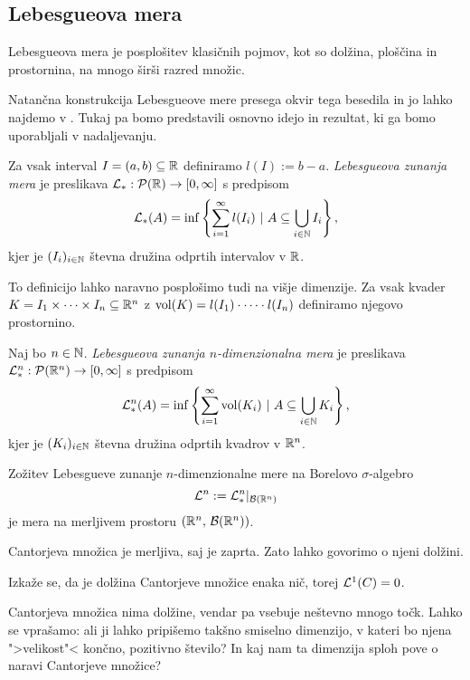 \subsection{Lebesgueova mera}
Lebesgueova mera je posplošitev klasičnih pojmov, kot so dolžina, ploščina in prostornina, na mnogo širši razred množic. 

Natančna konstrukcija Lebesgueove mere presega okvir tega besedila in jo lahko najdemo v \cite[poglavje 1]{mb-otm}. Tukaj pa bomo predstavili osnovno idejo in rezultat, ki ga bomo uporabljali v nadaljevanju.

\begin{definicija}
    Za vsak interval \(I = (a, b) \subseteq \mathbb{R}\) definiramo \(l(I) := b -a\). \emph{Lebesgueova zunanja mera} je preslikava \(\mathcal{L}_*: \mathcal{P}(\mathbb{R}) \to [0, \infty]\) s predpisom 
    \[\mathcal{L}_*(A) = \inf \left\{\sum_{i=1}^{\infty} l(I_i) \ | \ A \subseteq \bigcup_{i \in \mathbb{N}} I_i\right\},\]
    kjer je \((I_i)_{i \in \mathbb{N}}\) števna družina odprtih intervalov v \(\mathbb{R}\).
\end{definicija}

To definicijo lahko naravno posplošimo tudi na višje dimenzije. Za vsak kvader \(K = I_1 \times \cdots \times I_n \subseteq \mathbb{R}^n\) z \(\operatorname{vol}(K) = l(I_1) \cdot \cdots \cdot l(I_n)\) definiramo njegovo prostornino.

\begin{definicija}
    Naj bo \(n \in \mathbb{N}\). \emph{Lebesgueova zunanja \(n\)-dimenzionalna mera} je preslikava \(\mathcal{L}_*^n: \mathcal{P}(\mathbb{R}^n) \to [0, \infty]\) s predpisom 
    \[\mathcal{L}_*^n(A) = \inf \left\{\sum_{i=1}^{\infty} \operatorname{vol}(K_i) \ | \ A \subseteq \bigcup_{i \in \mathbb{N}} K_i\right\},\]
    kjer je \((K_i)_{i \in \mathbb{N}}\) števna družina odprtih kvadrov v \(\mathbb{R}^n\).
\end{definicija}

\begin{trditev}
    Zožitev Lebesgueve zunanje \(n\)-dimenzionalne mere na Borelovo \(\sigma\)-algebro
    \[\mathcal{L}^n := \mathcal{L}_*^n|_{\mathcal{B}(\mathbb{R}^n)}\] je mera na merljivem prostoru \((\mathbb{R}^n,\, \mathcal{B}(\mathbb{R}^n))\).
\end{trditev}

\begin{zgled}
    Cantorjeva množica je merljiva, saj je zaprta. Zato lahko govorimo o njeni dolžini.

    Izkaže se, da je dolžina Cantorjeve množice enaka nič, torej \(\mathcal{L}^1(C) = 0\).
\end{zgled}

Cantorjeva množica nima dolžine, vendar pa vsebuje neštevno mnogo točk. Lahko se vprašamo: ali ji lahko pripišemo takšno smiselno dimenzijo, v kateri bo njena ">velikost"< končno, pozitivno število? In kaj nam ta dimenzija sploh pove o naravi Cantorjeve množice?